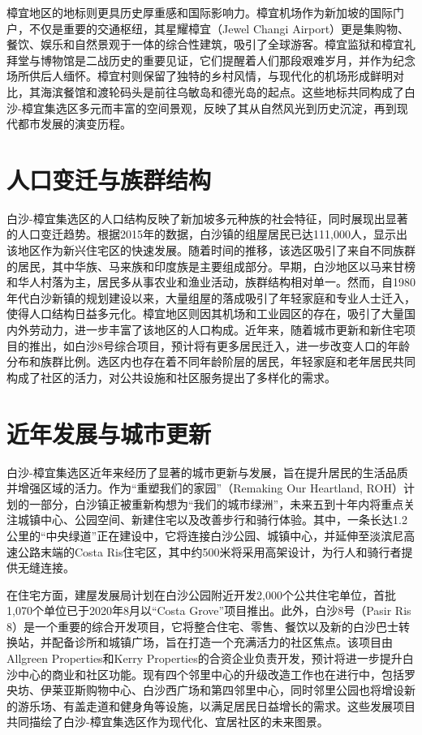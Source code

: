 \documentclass[11pt,a4paper,twoside,openany]{book}
\begin{document}
樟宜地区的地标则更具历史厚重感和国际影响力。樟宜机场作为新加坡的国际门户，不仅是重要的交通枢纽，其星耀樟宜（Jewel Changi Airport）更是集购物、餐饮、娱乐和自然景观于一体的综合性建筑，吸引了全球游客。樟宜监狱和樟宜礼拜堂与博物馆是二战历史的重要见证，它们提醒着人们那段艰难岁月，并作为纪念场所供后人缅怀。樟宜村则保留了独特的乡村风情，与现代化的机场形成鲜明对比，其海滨餐馆和渡轮码头是前往乌敏岛和德光岛的起点。这些地标共同构成了白沙-樟宜集选区多元而丰富的空间景观，反映了其从自然风光到历史沉淀，再到现代都市发展的演变历程。

\section{人口变迁与族群结构}
白沙-樟宜集选区的人口结构反映了新加坡多元种族的社会特征，同时展现出显著的人口变迁趋势。根据2015年的数据，白沙镇的组屋居民已达111,000人，显示出该地区作为新兴住宅区的快速发展。随着时间的推移，该选区吸引了来自不同族群的居民，其中华族、马来族和印度族是主要组成部分。早期，白沙地区以马来甘榜和华人村落为主，居民多从事农业和渔业活动，族群结构相对单一。然而，自1980年代白沙新镇的规划建设以来，大量组屋的落成吸引了年轻家庭和专业人士迁入，使得人口结构日益多元化。樟宜地区则因其机场和工业园区的存在，吸引了大量国内外劳动力，进一步丰富了该地区的人口构成。近年来，随着城市更新和新住宅项目的推出，如白沙8号综合项目，预计将有更多居民迁入，进一步改变人口的年龄分布和族群比例。选区内也存在着不同年龄阶层的居民，年轻家庭和老年居民共同构成了社区的活力，对公共设施和社区服务提出了多样化的需求。

\section{近年发展与城市更新}
白沙-樟宜集选区近年来经历了显著的城市更新与发展，旨在提升居民的生活品质并增强区域的活力。作为“重塑我们的家园”（Remaking Our Heartland, ROH）计划的一部分，白沙镇正被重新构想为“我们的城市绿洲”，未来五到十年内将重点关注城镇中心、公园空间、新建住宅以及改善步行和骑行体验。其中，一条长达1.2公里的“中央绿道”正在建设中，它将连接白沙公园、城镇中心，并延伸至淡滨尼高速公路末端的Costa Ris住宅区，其中约500米将采用高架设计，为行人和骑行者提供无缝连接。

在住宅方面，建屋发展局计划在白沙公园附近开发2,000个公共住宅单位，首批1,070个单位已于2020年8月以“Costa Grove”项目推出。此外，白沙8号（Pasir Ris 8）是一个重要的综合开发项目，它将整合住宅、零售、餐饮以及新的白沙巴士转换站，并配备诊所和城镇广场，旨在打造一个充满活力的社区焦点。该项目由Allgreen Properties和Kerry Properties的合资企业负责开发，预计将进一步提升白沙中心的商业和社区功能。现有四个邻里中心的升级改造工作也在进行中，包括罗央坊、伊莱亚斯购物中心、白沙西广场和第四邻里中心，同时邻里公园也将增设新的游乐场、有盖走道和健身角等设施，以满足居民日益增长的需求。这些发展项目共同描绘了白沙-樟宜集选区作为现代化、宜居社区的未来图景。
\end{document}
